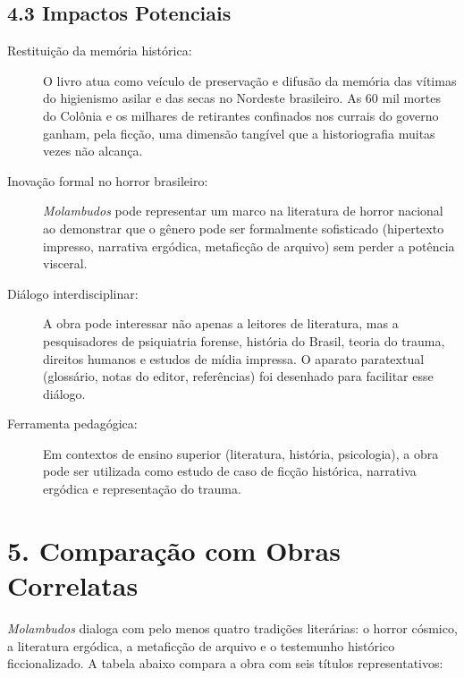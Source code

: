 \documentclass[14pt,openany]{extbook}
\begin{document}
\section*{4.3 Impactos Potenciais}

\begin{description}
\item[Restituição da memória histórica:] O livro atua como veículo de preservação e difusão da memória das vítimas do higienismo asilar e das secas no Nordeste brasileiro. As 60 mil mortes do Colônia e os milhares de retirantes confinados nos currais do governo ganham, pela ficção, uma dimensão tangível que a historiografia muitas vezes não alcança.
\item[Inovação formal no horror brasileiro:] \textit{Molambudos} pode representar um marco na literatura de horror nacional ao demonstrar que o gênero pode ser formalmente sofisticado (hipertexto impresso, narrativa ergódica, metaficção de arquivo) sem perder a potência visceral.
\item[Diálogo interdisciplinar:] A obra pode interessar não apenas a leitores de literatura, mas a pesquisadores de psiquiatria forense, história do Brasil, teoria do trauma, direitos humanos e estudos de mídia impressa. O aparato paratextual (glossário, notas do editor, referências) foi desenhado para facilitar esse diálogo.
\item[Ferramenta pedagógica:] Em contextos de ensino superior (literatura, história, psicologia), a obra pode ser utilizada como estudo de caso de ficção histórica, narrativa ergódica e representação do trauma.
\end{description}

\chapter*{5. Comparação com Obras Correlatas}

\noindent\textit{Molambudos} dialoga com pelo menos quatro tradições literárias: o horror cósmico, a literatura ergódica, a metaficção de arquivo e o testemunho histórico ficcionalizado. A tabela abaixo compara a obra com seis títulos representativos:

\vspace{0.6em}
\end{document}
